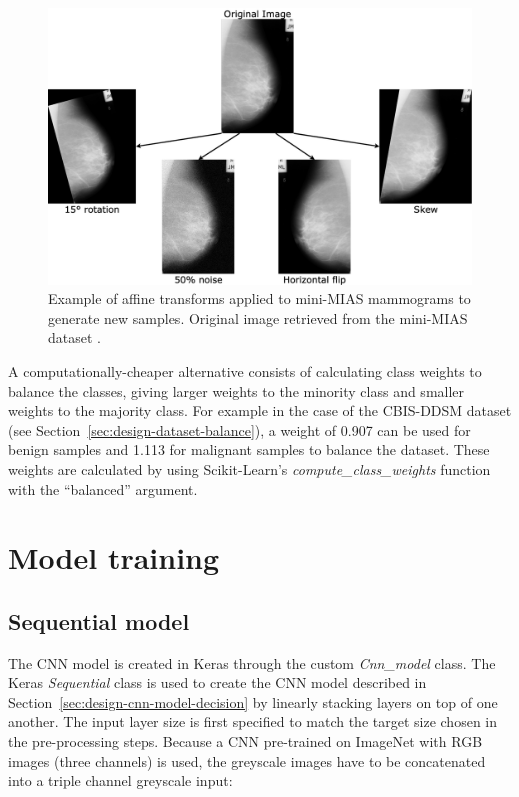 \begin{figure}[h]
\centerline{\includegraphics[width=\textwidth]{figures/implementation/Data augmentation transforms.png}}
\caption{\label{fig:implementation-Data augmentation transforms}Example of affine transforms applied to mini-MIAS mammograms to generate new samples. Original image retrieved from the mini-MIAS dataset \citep{Suckling1994}.}
\end{figure}

A computationally-cheaper alternative consists of calculating class weights to balance the classes, giving larger weights to the minority class and smaller weights to the majority class. For example in the  case of the CBIS-DDSM dataset (see Section~\ref{sec:design-dataset-balance}), a weight of 0.907 can be used for benign samples and 1.113 for malignant samples to balance the dataset. These weights are calculated by using Scikit-Learn's \textit{compute\_class\_weights} function with the ``balanced'' argument.


\section{Model training}

\subsection{Sequential model} 

The CNN model is created in Keras through the custom \textit{Cnn\_model} class. The Keras \textit{Sequential} class is used to create the CNN model described in Section~\ref{sec:design-cnn-model-decision} by linearly stacking layers on top of one another. The input layer size is first specified to match the target size chosen in the pre-processing steps. Because a CNN pre-trained on ImageNet with RGB images (three channels) is used, the greyscale images have to be concatenated into a triple channel greyscale input:


